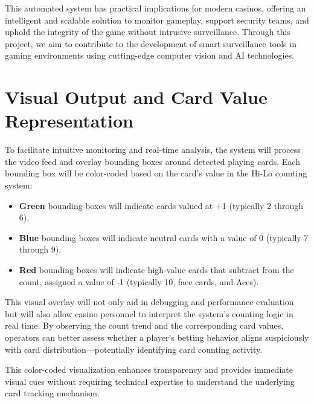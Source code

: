 \documentclass{article}
\begin{document}
This automated system has practical implications for modern casinos, offering an intelligent and scalable solution to monitor gameplay, support security teams, and uphold the integrity of the game without intrusive surveillance. Through this project, we aim to contribute to the development of smart surveillance tools in gaming environments using cutting-edge computer vision and AI technologies.

\section*{Visual Output and Card Value Representation}

To facilitate intuitive monitoring and real-time analysis, the system will process the video feed and overlay bounding boxes around detected playing cards. Each bounding box will be color-coded based on the card's value in the Hi-Lo counting system:

\begin{itemize}
	\item \textbf{Green} bounding boxes will indicate cards valued at +1 (typically 2 through 6).
	\item \textbf{Blue} bounding boxes will indicate neutral cards with a value of 0 (typically 7 through 9).
	\item \textbf{Red} bounding boxes will indicate high-value cards that subtract from the count, assigned a value of -1 (typically 10, face cards, and Aces).
\end{itemize}

This visual overlay will not only aid in debugging and performance evaluation but will also allow casino personnel to interpret the system's counting logic in real time. By observing the count trend and the corresponding card values, operators can better assess whether a player’s betting behavior aligns suspiciously with card distribution—potentially identifying card counting activity.

This color-coded visualization enhances transparency and provides immediate visual cues without requiring technical expertise to understand the underlying card tracking mechanism.
\end{document}
